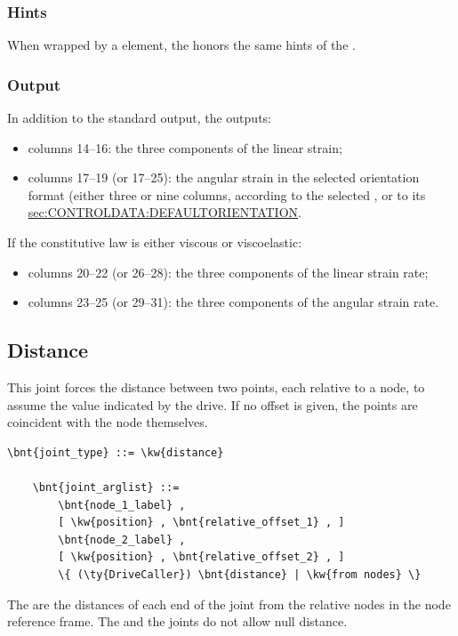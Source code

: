 \subsubsection{Hints}
When wrapped by a  element, the 
honors the same hints of the .

\subsubsection{Output}
In addition to the standard output, the 
outputs:
\begin{itemize}
\item columns 14--16: the three components of the linear strain;
\item columns 17--19 (or 17--25): the angular strain
in the selected orientation format (either three or nine columns,
according to the selected , or to its 
\hyperref{default value)}{default value, see Section~}{)}{sec:CONTROLDATA:DEFAULTORIENTATION}.
\end{itemize}
If the constitutive law is either viscous or viscoelastic:
\begin{itemize}
\item columns 20--22 (or 26--28): the three components
of the linear strain rate;
\item columns 23--25 (or 29--31): the three components
of the angular strain rate.
\end{itemize}




\subsection{Distance}
This joint forces the distance between two points,
each relative to a node, to assume the value indicated by the drive.
If no offset is given, the points are coincident with the node themselves.
\begin{Verbatim}[commandchars=\\\{\}]
    \bnt{joint_type} ::= \kw{distance}

    \bnt{joint_arglist} ::=
        \bnt{node_1_label} , 
        [ \kw{position} , \bnt{relative_offset_1} , ]
        \bnt{node_2_label} ,
        [ \kw{position} , \bnt{relative_offset_2} , ]
        \{ (\ty{DriveCaller}) \bnt{distance} | \kw{from nodes} \}
\end{Verbatim}
The  are the distances of each end
of the joint from the relative nodes in the node reference frame.
The  and the  joints
do not allow null distance.

